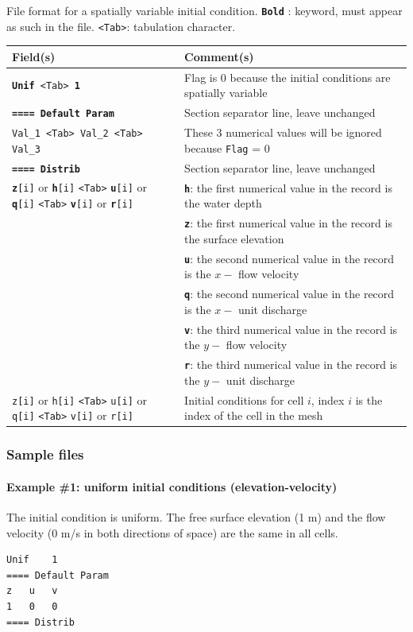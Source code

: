 File format for a spatially variable initial condition.  \texttt{\textbf{Bold}} : keyword, must appear as such in the file. \texttt{<Tab>}: tabulation character. \\
    \begin{tabular}{p{6cm} | p{9cm}}
    \hline
    Field(s) & Comment(s) \\
    \hline  \hline
    \texttt{\textbf{Unif} <Tab> \textbf{1}} & Flag is 0 because the initial conditions are spatially variable \\ \hline
    \texttt{\textbf{==== Default Param}} & Section separator line, leave unchanged \\  \hline
    \texttt{Val\_1 <Tab> Val\_2 <Tab> Val\_3}  & These 3 numerical values will be ignored because \texttt{Flag} = 0 \\ \hline
    \texttt{\textbf{==== Distrib}} & Section separator line, leave unchanged \\  \hline
    \texttt{\textbf{z}[i]} or \texttt{\textbf{h}[i]} \texttt{<Tab>} \texttt{\textbf{u}[i]} or \texttt{\textbf{q}[i]} \texttt{<Tab>} \texttt{\textbf{v}[i]} or \texttt{\textbf{r}[i]} 
    & \texttt{\textbf{h}}: the first numerical value in the record is the water depth \\ 
     & \texttt{\textbf{z}}: the first numerical value in the record is the surface elevation \\
     & \texttt{\textbf{u}}: the second numerical value in the record is the $x-$ flow velocity\\ 
     & \texttt{\textbf{q}}: the second numerical value in the record is the $x-$ unit discharge\\ 
     & \texttt{\textbf{v}}: the third numerical value in the record is the $y-$ flow velocity\\ 
     & \texttt{\textbf{r}}: the third numerical value in the record is the $y-$ unit discharge\\ 
     \hline
     \texttt{z[i]} or \texttt{h[i]} \texttt{<Tab>} \texttt{u[i]} or \texttt{q[i]} \texttt{<Tab>} \texttt{v[i]} or \texttt{r[i]} 
    &Initial conditions for cell $i$, index $i$ is the index of the cell in the mesh \\
    \hline
     \end{tabular}
%
\subsubsection{Sample files}
%
\paragraph*{Example \#1: uniform initial conditions (elevation-velocity)}
The initial condition is uniform. The free surface elevation (1 m) and the flow velocity (0 m/s in both directions of space) are the same in all cells.
\begin{verbatim}
Unif	1
==== Default Param
z	u	v
1	0	0
==== Distrib
\end{verbatim}
%
